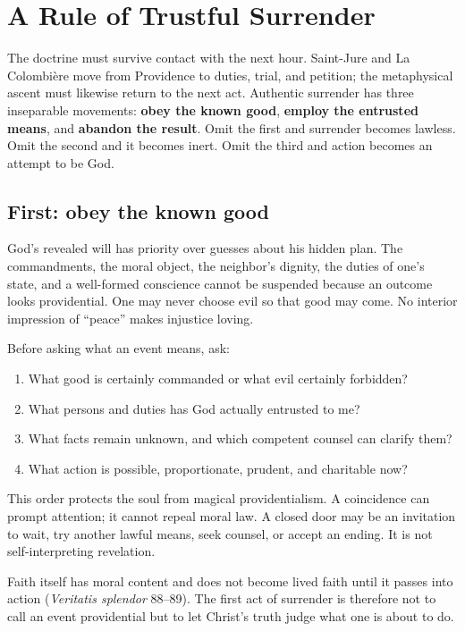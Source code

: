 \section{A Rule of Trustful Surrender}

The doctrine must survive contact with the next hour. Saint-Jure and La
Colombière move from Providence to duties, trial, and petition; the
metaphysical ascent must likewise return to the next act. Authentic surrender
has three inseparable movements: \textbf{obey the known good},
\textbf{employ the entrusted means}, and \textbf{abandon the result}. Omit the
first and surrender becomes lawless. Omit the second and it becomes inert.
Omit the third and action becomes an attempt to be God.

\subsection{First: obey the known good}

God's revealed will has priority over guesses about his hidden plan. The commandments, the moral object, the neighbor's dignity, the duties of one's state, and a well-formed conscience cannot be suspended because an outcome looks providential. One may never choose evil so that good may come. No interior impression of ``peace'' makes injustice loving.

Before asking what an event means, ask:

\begin{enumerate}[leftmargin=1.6em]
\item What good is certainly commanded or what evil certainly forbidden?
\item What persons and duties has God actually entrusted to me?
\item What facts remain unknown, and which competent counsel can clarify them?
\item What action is possible, proportionate, prudent, and charitable now?
\end{enumerate}

This order protects the soul from magical providentialism. A coincidence can prompt attention; it cannot repeal moral law. A closed door may be an invitation to wait, try another lawful means, seek counsel, or accept an ending. It is not self-interpreting revelation.

Faith itself has moral content and does not become lived faith until it passes
into action (\emph{Veritatis splendor} 88--89). The first act of surrender is
therefore not to call an event providential but to let Christ's truth judge
what one is about to do.

